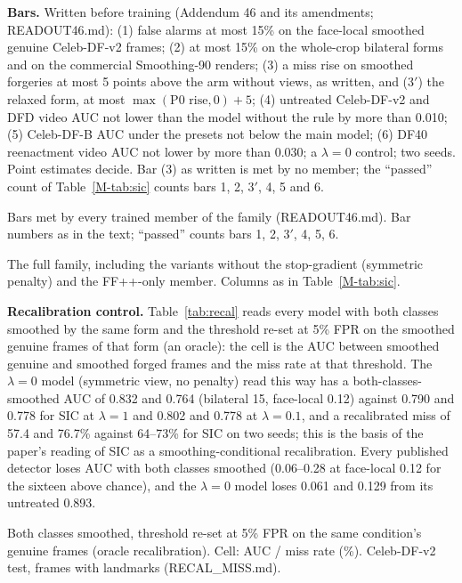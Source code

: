 \documentclass[10pt]{article}
\begin{document}
\textbf{Bars.} Written before training (Addendum 46 and its amendments; READOUT46.md): (1) false alarms at most 15\% on the
face-local smoothed genuine Celeb-DF-v2 frames; (2) at most 15\% on the whole-crop bilateral forms and on the commercial
Smoothing-90 renders; (3) a miss rise on smoothed forgeries at most 5 points above the arm without views, as written, and
(3$'$) the relaxed form, at most $\max(\text{P0 rise},0)+5$; (4) untreated Celeb-DF-v2 and DFD video AUC not lower than the
model without the rule by more than 0.010; (5) Celeb-DF-B AUC under the presets not below the main model; (6) DF40 reenactment
video AUC not lower by more than 0.030; a $\lambda=0$ control; two seeds. Point estimates decide. Bar (3) as written is met by
no member; the ``passed'' count of Table~\ref{M-tab:sic} counts bars 1, 2, 3$'$, 4, 5 and 6.
\begin{table}[H]
\centering
\caption{Bars met by every trained member of the family (READOUT46.md). Bar numbers as in the text; ``passed'' counts bars 1,
2, 3$'$, 4, 5, 6.}
\label{tab:sicbars}
\scriptsize
\begin{adjustbox}{max width=\linewidth}\end{adjustbox}
\end{table}
\begin{table}[H]
\centering
\caption{The full family, including the variants without the stop-gradient (symmetric penalty) and the FF++-only member.
Columns as in Table~\ref{M-tab:sic}.}
\label{tab:sicfull}
\scriptsize
\begin{adjustbox}{max width=\linewidth}\end{adjustbox}
\end{table}

\textbf{Recalibration control.} Table~\ref{tab:recal} reads every model with both classes smoothed by the same form and the
threshold re-set at 5\% FPR on the smoothed genuine frames of that form (an oracle): the cell is the AUC between smoothed
genuine and smoothed forged frames and the miss rate at that threshold. The $\lambda=0$ model (symmetric view, no penalty)
read this way has a both-classes-smoothed AUC of 0.832 and 0.764 (bilateral 15, face-local 0.12) against 0.790 and 0.778 for
SIC at $\lambda=1$ and 0.802 and 0.778 at $\lambda=0.1$, and a recalibrated miss of 57.4 and 76.7\% against 64--73\% for SIC on
two seeds; this is the basis of the paper's reading of SIC as a smoothing-conditional recalibration. Every published detector
loses AUC with both classes smoothed (0.06--0.28 at face-local 0.12 for the sixteen above chance), and the $\lambda=0$ model
loses 0.061 and 0.129 from its untreated 0.893.
\begin{table}[H]
\centering
\caption{Both classes smoothed, threshold re-set at 5\% FPR on the same condition's genuine frames (oracle recalibration). Cell:
AUC / miss rate (\%). Celeb-DF-v2 test, frames with landmarks (RECAL\_MISS.md).}
\label{tab:recal}
\scriptsize
\begin{adjustbox}{max width=\linewidth}\end{adjustbox}
\end{table}
\end{document}
